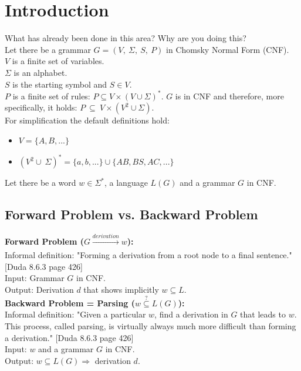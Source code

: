 
\section{Introduction}\label{Introduction}

\noindent What has already been done in this area? Why are you doing this?\\ 

\noindent Let there be a grammar $G=(V,\ \Sigma,\ S,\ P)$ in Chomsky Normal Form (CNF).\\
$V$ is a finite set of variables. \\
$\Sigma$ is an alphabet. \\
$S$ is the starting symbol and $S \in V$. \\
$P$ is a finite set of rules: $P \subseteq V \times (V \cup \Sigma)^{*}$. $G$ is in CNF and therefore, more specifically, it holds:  $P\ \subseteq\ V \times (V^{2} \cup \Sigma)$.\\
 
\noindent For simplification the default definitions hold:
\begin{itemize}
	\item $V = \{A, B, ...\}$
	\item $(V^2 \cup\ \Sigma)^{*}=\{a, b, ...\} \cup \{AB, BS, AC, ... \}$
\end{itemize}

\noindent Let there be a word $w \in \Sigma^*$, a language $L(G)$ and a grammar $G$ in CNF. 

\subsection{Forward Problem vs. Backward Problem}

\noindent\textbf{Forward Problem ($G \xrightarrow[]{derivation} w$):}\\
Informal definition: "Forming a derivation from a root node to a final sentence."  [Duda 8.6.3 page 426]\\
Input: Grammar $G$ in CNF.\\
Output: Derivation $d$ that shows implicitly $w \subseteq L$.\\

\noindent\textbf{Backward Problem = Parsing ($w\overset{?}{\subseteq}L(G)$):}\\
Informal definition: "Given a particular $w$, find a derivation in $G$ that leads to $w$. This process, called parsing, is virtually always much more difficult than forming a derivation."  [Duda 8.6.3 page 426]\\
Input: $w$ and a grammar $G$ in CNF.\\
Output: $w \subseteq L(G) \Longrightarrow$ derivation $d$.\\

